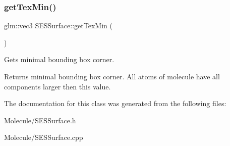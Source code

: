 \subsubsection{\texorpdfstring{getTexMin()}{getTexMin()}}
{\footnotesize\ttfamily glm\+::vec3 S\+E\+S\+Surface\+::get\+Tex\+Min (\begin{DoxyParamCaption}{ }\end{DoxyParamCaption})}

Gets minimal bounding box corner.

\begin{DoxyReturn}{Returns}
minimal bounding box corner. All atoms of molecule have all components larger then this value. 
\end{DoxyReturn}


The documentation for this class was generated from the following files\+:\begin{DoxyCompactItemize}
\item 
Molecule/S\+E\+S\+Surface.\+h\item 
Molecule/S\+E\+S\+Surface.\+cpp\end{DoxyCompactItemize}
